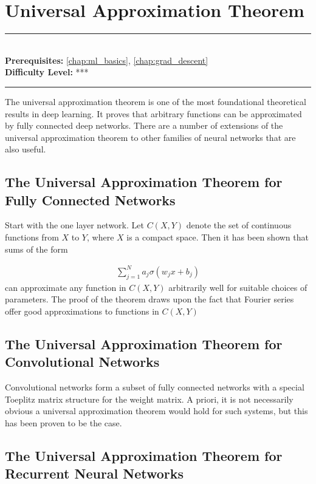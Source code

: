 \documentclass[book.tex]{subfiles}
\begin{document}
\chapter{Universal Approximation Theorem}
\label{chap:univ_approx}
\noindent\rule{11cm}{0.4pt} \\
\textbf{Prerequisites:}  \autoref{chap:ml_basics}, \autoref{chap:grad_descent}  \\
\textbf{Difficulty Level:} *** \\
\noindent\rule{11cm}{0.4pt}
\vspace{5mm}

The universal approximation theorem is one of the most foundational theoretical results in deep learning. It proves that arbitrary functions can be approximated by fully connected deep networks. There are a number of extensions of the universal approximation theorem to other families of neural networks that are also useful.

\section{The Universal Approximation Theorem for Fully Connected Networks}

Start with the one layer network. Let $C(X, Y)$ denote the set of continuous functions from $X$ to $Y$, where $X$ is a compact space. Then it has been shown that sums of the form

\begin{align}
\sum_{j=1}^N a_j\sigma(w_jx + b_j)
\end{align}
can approximate any function in $C(X, Y)$ arbitrarily well for suitable choices of parameters. The proof of the theorem draws upon the fact that Fourier series offer good approximations to functions in $C(X, Y)$

\section{The Universal Approximation Theorem for Convolutional Networks}

Convolutional networks form a subset of fully connected networks with a special Toeplitz matrix structure for the weight matrix. A priori, it is not necessarily obvious a universal approximation theorem would hold for such systems, but this has been proven to be the case.

\section{The Universal Approximation Theorem for Recurrent Neural Networks}
\end{document}
